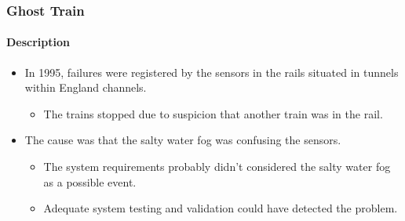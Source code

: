 \begin{frame}[hasprev=false,hasnext=false]
\label{example:ghost-train}
\frametitle{Ghost Train}
\framesubtitle{Description}

\begin{itemize}
	\item In 1995, failures were registered by the sensors in the rails
	situated in tunnels within England channels.
	\begin{itemize}
		\item The trains stopped due to suspicion that another train was in the
		rail.
	\end{itemize}

	\item The cause was that the salty water fog was confusing the sensors.
	\begin{itemize}
		\item The system requirements probably didn't considered the salty
		water fog as a possible event.

		\item Adequate system testing and validation could have detected the
		problem.
	\end{itemize}
\end{itemize}
\end{frame}